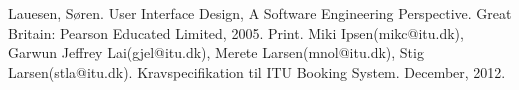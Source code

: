 \begin{thebibliography}{9}
 Lauesen, Søren. User Interface Design, A Software Engineering Perspective. Great Britain: Pearson Educated Limited, 2005.  Print.
 Miki Ipsen(mikc@itu.dk), Garwun Jeffrey Lai(gjel@itu.dk), Merete Larsen(mnol@itu.dk), Stig Larsen(stla@itu.dk). Kravspecifikation til ITU Booking System. December, 2012.
\end{thebibliography}
\label{A_BIB}